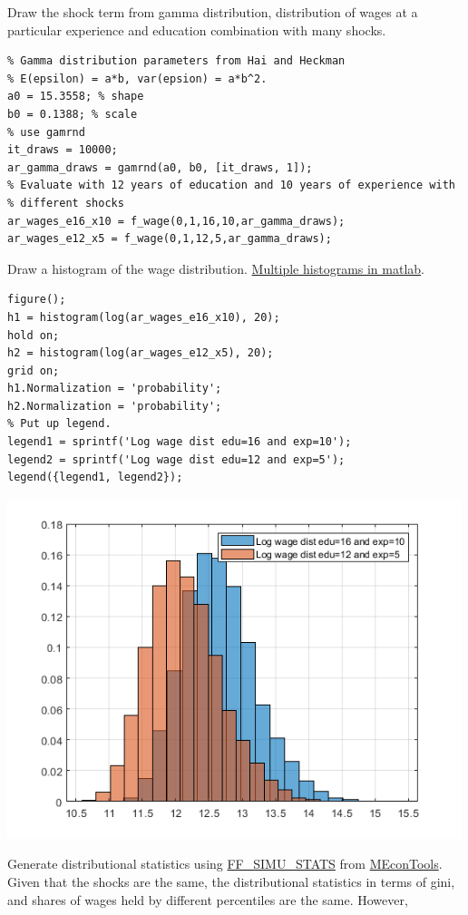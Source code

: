 \documentclass[
]{book}
\begin{document}
Draw the shock term from gamma distribution, distribution of wages at a
particular experience and education combination with many shocks.

\begin{verbatim}
% Gamma distribution parameters from Hai and Heckman
% E(epsilon) = a*b, var(epsion) = a*b^2.
a0 = 15.3558; % shape
b0 = 0.1388; % scale
% use gamrnd
it_draws = 10000;
ar_gamma_draws = gamrnd(a0, b0, [it_draws, 1]);
% Evaluate with 12 years of education and 10 years of experience with
% different shocks
ar_wages_e16_x10 = f_wage(0,1,16,10,ar_gamma_draws);
ar_wages_e12_x5 = f_wage(0,1,12,5,ar_gamma_draws);
\end{verbatim}

Draw a histogram of the wage distribution. \href{https://www.mathworks.com/help/matlab/ref/matlab.graphics.chart.primitive.histogram.html}{Multiple histograms in
matlab}.

\begin{verbatim}
figure();
h1 = histogram(log(ar_wages_e16_x10), 20);
hold on;
h2 = histogram(log(ar_wages_e12_x5), 20);
grid on;
h1.Normalization = 'probability';
h2.Normalization = 'probability';
% Put up legend.
legend1 = sprintf('Log wage dist edu=16 and exp=10');
legend2 = sprintf('Log wage dist edu=12 and exp=5');
legend({legend1, legend2});
\end{verbatim}

\includegraphics[width=5.20833in,height=\textheight]{img/fs_wage_equation_images/figure_1.png}

Generate distributional statistics using
\href{https://fanwangecon.github.io/MEconTools/MEconTools/doc/stats/htmlpdfm/fx_simu_stats.html}{FF\_SIMU\_STATS}
from \href{https://fanwangecon.github.io/MEconTools/}{MEconTools}. Given that
the shocks are the same, the distributional statistics in terms of gini,
and shares of wages held by different percentiles are the same. However,
\end{document}
